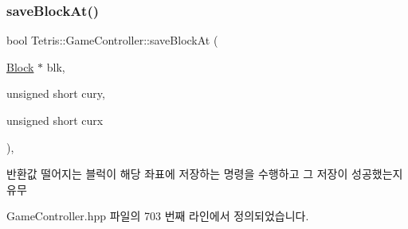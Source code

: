 \mbox{\label{class_tetris_1_1_game_controller_adc067380df0f0da4ea4a358d00d6a123}} 
\subsubsection{\texorpdfstring{save\+Block\+At()}{saveBlockAt()}\hspace{0.1cm}{\footnotesize\ttfamily [2/2]}}
{\footnotesize\ttfamily bool Tetris\+::\+Game\+Controller\+::save\+Block\+At (\begin{DoxyParamCaption}\item[{\hyperlink{class_tetris_1_1_block}{Block} $\ast$}]{blk,  }\item[{unsigned short}]{cury,  }\item[{unsigned short}]{curx }\end{DoxyParamCaption})\hspace{0.3cm}{\ttfamily [inline]}, {\ttfamily [protected]}}

\begin{DoxyReturn}{반환값}
떨어지는 블럭이 해당 좌표에 저장하는 명령을 수행하고 그 저장이 성공했는지유무 
\end{DoxyReturn}


Game\+Controller.\+hpp 파일의 703 번째 라인에서 정의되었습니다.



